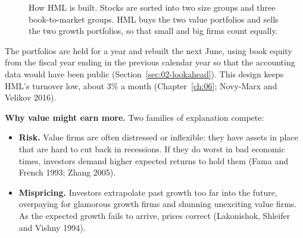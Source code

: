 \begin{figure}[!htbp]
  \centering
\caption{How HML is built. Stocks are sorted into two size groups and three book-to-market groups. HML buys the two value portfolios and sells the two growth portfolios, so that small and big firms count equally.}
\label{fig:08-hml}
\end{figure}

The portfolios are held for a year and rebuilt the next June, using book equity from the fiscal year ending in the previous calendar year so that the accounting data would have been public (Section~\ref{sec:02-lookahead}). This design keeps HML's turnover low, about 3\% a month (Chapter~\ref{ch:06}; Novy-Marx and Velikov 2016).

\textbf{Why value might earn more.} Two families of explanation compete:

\begin{itemize}
  \item \textbf{Risk.} Value firms are often distressed or inflexible: they have assets in place that are hard to cut back in recessions. If they do worst in bad economic times, investors demand higher expected returns to hold them (Fama and French 1993; Zhang 2005).
  \item \textbf{Mispricing.} Investors extrapolate past growth too far into the future, overpaying for glamorous growth firms and shunning unexciting value firms. As the expected growth fails to arrive, prices correct (Lakonishok, Shleifer and Vishny 1994).
\end{itemize}

